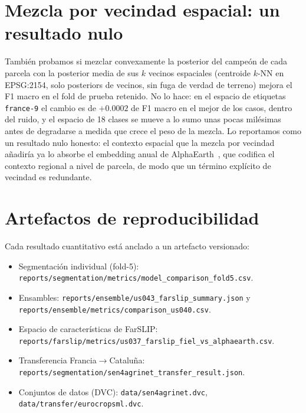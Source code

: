 \section{Mezcla por vecindad espacial: un resultado nulo}
\label{app:neighbourhood}
También probamos si mezclar convexamente la posterior del campeón de cada
parcela con la posterior media de sus $k$ vecinos espaciales (centroide
$k$-NN en EPSG:2154, solo posteriors de vecinos, sin fuga de verdad de
terreno) mejora el F1 macro en el fold de prueba retenido. No lo hace: en
el espacio de etiquetas \texttt{france-9} el cambio es de $+0.0002$ de F1
macro en el mejor de los casos, dentro del ruido, y el espacio de 18
clases se mueve a lo sumo unas pocas milésimas antes de degradarse a
medida que crece el peso de la mezcla. Lo reportamos como un resultado
nulo honesto: el contexto espacial que la mezcla por vecindad añadiría ya
lo absorbe el embedding anual de AlphaEarth~\cite{brown2025alphaearth},
que codifica el contexto regional a nivel de parcela, de modo que un
término explícito de vecindad es redundante.

\section{Artefactos de reproducibilidad}
\label{app:repro}

Cada resultado cuantitativo está anclado a un artefacto versionado:

\begin{itemize}[leftmargin=*]
    \item Segmentación individual (fold-5):
    \texttt{reports/segmentation/metrics/model\_comparison\_fold5.csv}.
    \item Ensambles:
    \texttt{reports/ensemble/us043\_farslip\_summary.json} y
    \texttt{reports/ensemble/metrics/comparison\_us040.csv}.
    \item Espacio de características de FarSLIP:
    \texttt{reports/farslip/metrics/us037\_farslip\_fiel\_vs\_alphaearth.csv}.
    \item Transferencia Francia$\rightarrow$Cataluña:
    \texttt{reports/segmentation/sen4agrinet\_transfer\_result.json}.
    \item Conjuntos de datos (DVC): \texttt{data/sen4agrinet.dvc},
    \texttt{data/transfer/eurocropsml.dvc}.
\end{itemize}
